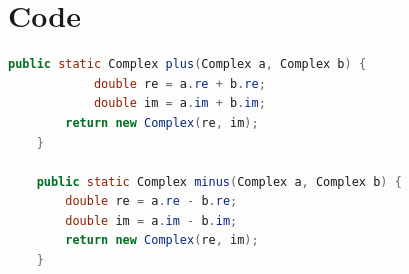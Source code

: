 \documentclass[12pt]{article}
\begin{document}
\section{Code}

\begin{lstlisting}[language=Java, title={Complex.java: Z. 19-29}]
    public static Complex plus(Complex a, Complex b) {
            double re = a.re + b.re;
            double im = a.im + b.im;
        return new Complex(re, im);
    }
    
    public static Complex minus(Complex a, Complex b) {
        double re = a.re - b.re;
        double im = a.im - b.im;
        return new Complex(re, im);
    }
    \end{lstlisting}
    
\end{document}
